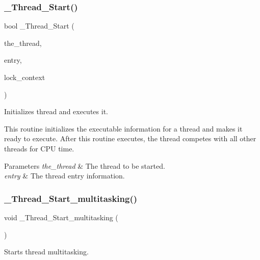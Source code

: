 \subsubsection{\texorpdfstring{\_Thread\_Start()}{\_Thread\_Start()}}
{\footnotesize\ttfamily bool \+\_\+\+Thread\+\_\+\+Start (\begin{DoxyParamCaption}\item[{\mbox{\hyperlink{struct__Thread__Control}{Thread\+\_\+\+Control}} $\ast$}]{the\+\_\+thread,  }\item[{const \mbox{\hyperlink{structThread__Entry__information}{Thread\+\_\+\+Entry\+\_\+information}} $\ast$}]{entry,  }\item[{\mbox{\hyperlink{structISR__lock__Context}{I\+S\+R\+\_\+lock\+\_\+\+Context}} $\ast$}]{lock\+\_\+context }\end{DoxyParamCaption})}



Initializes thread and executes it. 

This routine initializes the executable information for a thread and makes it ready to execute. After this routine executes, the thread competes with all other threads for C\+PU time.


\begin{DoxyParams}{Parameters}
{\em the\+\_\+thread} & The thread to be started. \\
\hline
{\em entry} & The thread entry information. \\
\hline
\end{DoxyParams}
\mbox{\label{group__RTEMSScoreThread_gab27215302814d0aa0ec3306b165ea247}} 
\subsubsection{\texorpdfstring{\_Thread\_Start\_multitasking()}{\_Thread\_Start\_multitasking()}}
{\footnotesize\ttfamily void \+\_\+\+Thread\+\_\+\+Start\+\_\+multitasking (\begin{DoxyParamCaption}\item[{void}]{ }\end{DoxyParamCaption})}



Starts thread multitasking. 

